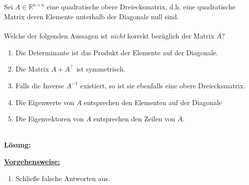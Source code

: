 \subsection*{}
Sei $ A \in \mathbb{R}^{n\times n} $ eine quadratische obere Dreiecksmatrix, d.h. eine quadratische Matrix deren Elemente unterhalb der Diagonale null sind.\\
\\
Welche der folgenden Aussagen ist \textit{nicht} korrekt bezüglich der Matrix $ A $?
\renewcommand{\labelenumi}{(\alph{enumi})}
\begin{enumerate}
	\item 
	Die Determinante ist das Produkt der Elemente auf der Diagonale.
	\item
	Die Matrix $ A + A^\top $ ist symmetrisch.
	\item
	Falls die Inverse $ A^{-1} $ existiert, so ist sie ebenfalls eine obere Dreiecksmatrix.
	\item
	Die Eigenwerte von $ A $ entsprechen den Elementen auf der Diagonale
	\item 
	Die Eigenvektoren von $ A $ entsprechen den Zeilen von $ A $.
\end{enumerate}
\ \\
\textbf{Lösung:}
\begin{mdframed}
	\underline{\textbf{Vorgehensweise:}}
	\renewcommand{\labelenumi}{\theenumi.}
	\begin{enumerate}
		\item Schließe falsche Antworten aus.
	\end{enumerate}
\end{mdframed}


